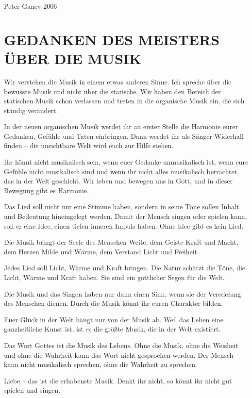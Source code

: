 \documentclass[11pt,a5paper,twoside]{article}
\begin{document}
\begin{flushright}
	Peter Ganev 2006
\end{flushright}


\section[Gedanken des Meisters über die Musik]{GEDANKEN DES MEISTERS ÜBER DIE MUSIK}

Wir verstehen die Musik in einem etwas anderen Sinne. Ich spreche über die bewusste Musik und nicht über die statische. Wir haben den Bereich der statischen Musik schon verlassen und treten in die organische Musik ein, die sich ständig verändert. 

In der neuen organischen Musik werdet ihr an erster Stelle die Harmonie eurer Gedanken, Gefühle und Taten einbringen. Dann werdet ihr als Sänger Widerhall finden – die unsichtbare Welt wird euch zur Hilfe stehen.

Ihr könnt nicht musikalisch sein, wenn euer Gedanke unmusikalisch ist, wenn eure Gefühle nicht musikalisch sind und wenn ihr nicht alles musikalisch betrachtet, das in der Welt geschieht. Wir leben und bewegen uns in Gott, und in dieser Bewegung gibt es Harmonie.

Das Lied soll nicht nur eine Stimme haben, sondern in seine Töne sollen Inhalt und Bedeutung hineingelegt werden. Damit der Mensch singen oder spielen kann, soll er eine Idee, einen tiefen inneren Impuls haben. Ohne Idee gibt es kein Lied.

Die Musik bringt der Seele des Menschen Weite, dem Geiste Kraft und Macht, dem Herzen Milde und Wärme, dem Verstand Licht und Freiheit.

Jedes Lied soll Licht, Wärme und Kraft bringen. Die Natur schätzt die Töne, die Licht, Wärme und Kraft haben. Sie sind ein göttlicher Segen für die Welt.

Die Musik und das Singen haben nur dann einen Sinn, wenn sie der Veredelung des Menschen dienen. Durch die Musik könnt ihr euren Charakter bilden.

Euer Glück in der Welt hängt nur von der Musik ab. Weil das Leben eine ganzheitliche Kunst ist, ist es die größte Musik, die in der Welt existiert. 

Das Wort Gottes ist die Musik des Lebens. Ohne die Musik, ohne die Weisheit und ohne die Wahrheit kann das Wort nicht gesprochen werden. Der Mensch kann nicht musikalisch sprechen, ohne die Wahrheit zu sprechen.

Liebe – das ist die erhabenste Musik. Denkt ihr nicht, so könnt ihr nicht gut spielen und singen.
\end{document}
